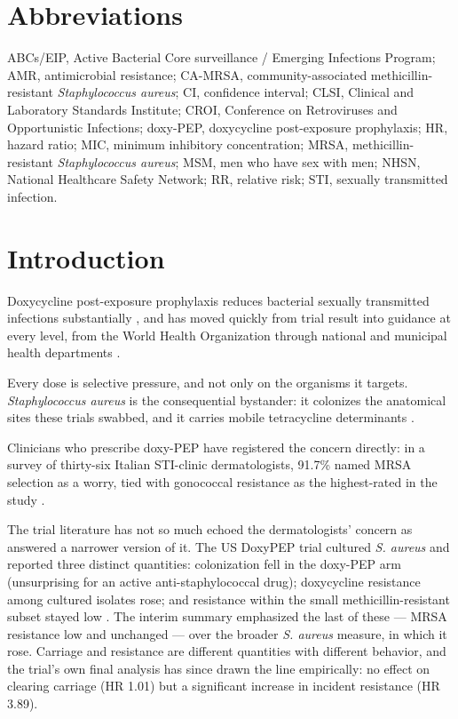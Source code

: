 \documentclass[10pt,letterpaper]{article}
\begin{document}
\section*{Abbreviations}
ABCs/EIP, Active Bacterial Core surveillance / Emerging Infections Program; AMR, antimicrobial
resistance; CA-MRSA, community-associated methicillin-resistant \emph{Staphylococcus aureus}; CI,
confidence interval; CLSI, Clinical and Laboratory Standards Institute; CROI, Conference on
Retroviruses and Opportunistic Infections; doxy-PEP, doxycycline post-exposure prophylaxis; HR,
hazard ratio; MIC, minimum inhibitory concentration; MRSA, methicillin-resistant \emph{Staphylococcus
aureus}; MSM, men who have sex with men; NHSN, National Healthcare Safety Network; RR, relative risk;
STI, sexually transmitted infection.

\linenumbers

\section*{Introduction}

Doxycycline post-exposure prophylaxis reduces bacterial sexually
transmitted infections substantially \cite{luetkemeyer2023}, and has
moved quickly from trial result into guidance at every level, from the
World Health Organization through national and municipal health
departments \cite{cdc2024doxypep, sfdph2022}.

Every dose is selective pressure, and not only on the organisms it
targets. \emph{Staphylococcus aureus} is the consequential bystander: it
colonizes the anatomical sites these trials swabbed, and it carries
mobile tetracycline determinants \cite{grossman2016}.

Clinicians who prescribe doxy-PEP have registered the concern directly:
in a survey of thirty-six Italian STI-clinic dermatologists, 91.7\%
named MRSA selection as a worry, tied with gonococcal resistance as the
highest-rated in the study \cite{dona2026}.

The trial literature has not so much echoed the dermatologists' concern
as answered a narrower version of it. The US DoxyPEP trial cultured
\emph{S. aureus} and reported three distinct quantities: colonization
fell in the doxy-PEP arm (unsurprising for an active anti-staphylococcal
drug); doxycycline resistance among cultured isolates rose; and
resistance within the small methicillin-resistant subset stayed low
\cite{luetkemeyer2023croi}. The interim summary emphasized the last of
these --- MRSA resistance low and unchanged --- over the broader
\emph{S. aureus} measure, in which it rose. Carriage and resistance are
different quantities with different behavior, and the trial's own final
analysis has since drawn the line empirically: no effect on clearing
carriage (HR 1.01) but a significant increase in incident resistance (HR
3.89).
\end{document}
